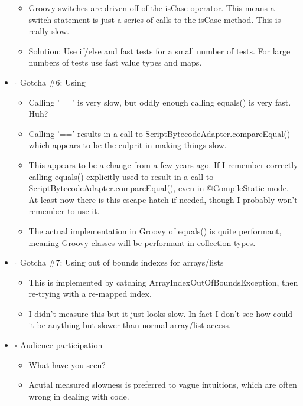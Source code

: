 \documentclass[11pt]{article}
\begin{document}
\begin{itemize}
\begin{itemize}
\item Groovy switches are driven off of the isCase operator. This means a switch statement is just a series of calls to the isCase method. This is really slow.

\item Solution: Use if/else and fast tests for a small number of tests. For large numbers of tests use fast value types and maps.
\end{itemize}

\item $\square$ Gotcha \#6: Using ==

\begin{itemize}
\item Calling '==' is very slow, but oddly enough calling equals() is very fast. Huh?

\item Calling '==' results in a call to ScriptBytecodeAdapter.compareEqual() which appears to be the culprit in making things slow.

\item This appears to be a change from a few years ago. If I remember correctly calling equals() explicitly used to result in a call to ScriptBytecodeAdapter.compareEqual(), even in @CompileStatic mode. At least now there is this escape hatch if needed, though I probably won't remember to use it.

\item The actual implementation in Groovy of equals() is quite performant, meaning Groovy classes will be performant in collection types.
\end{itemize}

\item $\square$ Gotcha \#7: Using out of bounds indexes for arrays/lists

\begin{itemize}
\item This is implemented by catching ArrayIndexOutOfBoundsException, then re-trying with a re-mapped index.

\item I didn't measure this but it just looks slow. In fact I don't see how could it be anything but slower than normal array/list access.
\end{itemize}

\item $\square$ Audience participation

\begin{itemize}
\item What have you seen?

\item Acutal measured slowness is preferred to vague intuitions, which are often wrong in dealing with code.
\end{itemize}
\end{itemize}
\end{document}
